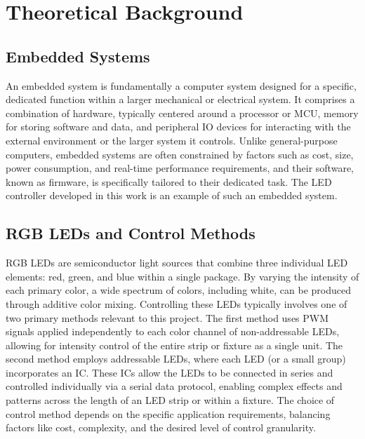 \section{Theoretical Background}
\label{sec:theoretical_background}
\subsection{Embedded Systems}
An embedded system is fundamentally a computer system designed for a specific, dedicated function within a larger mechanical or electrical system. It comprises a combination of hardware, typically centered around a processor or \ac{MCU}, memory for storing software and data, and peripheral \ac{IO} devices for interacting with the external environment or the larger system it controls. Unlike general-purpose computers, embedded systems are often constrained by factors such as cost, size, power consumption, and real-time performance requirements, and their software, known as firmware, is specifically tailored to their dedicated task. The \ac{LED} controller developed in this work is an example of such an embedded system.

\subsection{RGB LEDs and Control Methods}
\ac{RGB} \ac{LED}s are semiconductor light sources that combine three individual \ac{LED} elements: red, green, and blue within a single package. By varying the intensity of each primary color, a wide spectrum of colors, including white, can be produced through additive color mixing. Controlling these \ac{LED}s typically involves one of two primary methods relevant to this project. The first method uses \ac{PWM} signals applied independently to each color channel of non-addressable \ac{LED}s, allowing for intensity control of the entire strip or fixture as a single unit. The second method employs addressable \ac{LED}s, where each \ac{LED} (or a small group) incorporates an \ac{IC}. These \ac{IC}s allow the \ac{LED}s to be connected in series and controlled individually via a serial data protocol, enabling complex effects and patterns across the length of an \ac{LED} strip or within a fixture. The choice of control method depends on the specific application requirements, balancing factors like cost, complexity, and the desired level of control granularity.

